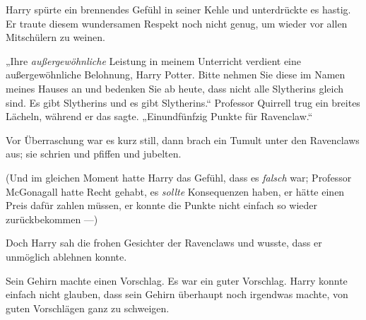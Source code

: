 Harry spürte ein brennendes Gefühl in seiner Kehle und unterdrückte es hastig. Er traute diesem wundersamen Respekt noch nicht genug, um wieder vor allen Mitschülern zu weinen.

„Ihre \emph{außergewöhnliche} Leistung in meinem Unterricht verdient eine außergewöhnliche Belohnung, Harry Potter. Bitte nehmen Sie diese im Namen meines Hauses an und bedenken Sie ab heute, dass nicht alle Slytherins gleich sind. Es gibt Slytherins und es gibt Slytherins.“ Professor Quirrell trug ein breites Lächeln, während er das sagte. „Einundfünfzig Punkte für Ravenclaw.“

Vor Überraschung war es kurz still, dann brach ein Tumult unter den Ravenclaws aus; sie schrien und pfiffen und jubelten.

(Und im gleichen Moment hatte Harry das Gefühl, dass es \emph{falsch} war; Professor McGonagall hatte Recht gehabt, es \emph{sollte} Konsequenzen haben, er hätte einen Preis dafür zahlen müssen, er konnte die Punkte nicht einfach so wieder zurückbekommen —)

Doch Harry sah die frohen Gesichter der Ravenclaws und wusste, dass er unmöglich ablehnen konnte.

Sein Gehirn machte einen Vorschlag. Es war ein guter Vorschlag. Harry konnte einfach nicht glauben, dass sein Gehirn überhaupt noch irgendwas machte, von guten Vorschlägen ganz zu schweigen.

